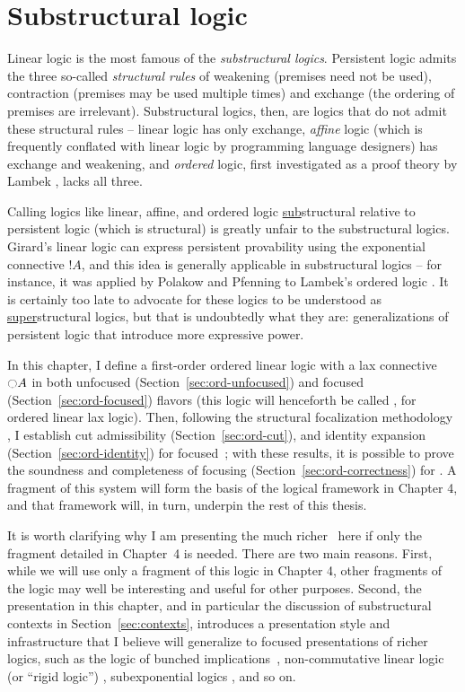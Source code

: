 \chapter{Substructural logic}

Linear logic is the most famous of the {\it substructural logics}.
Persistent logic admits the three so-called {\it structural rules} of
weakening (premises need not be used), contraction (premises may be
used multiple times) and exchange (the ordering of premises are
irrelevant). Substructural logics, then, are logics that do not admit
these structural rules -- linear logic has only exchange, {\it affine}
logic (which is frequently conflated with linear logic by programming
language designers) has exchange and weakening, and {\it ordered}
logic, first investigated as a proof theory by Lambek
\cite{lambek58mathematics}, lacks all three.  

Calling logics like
linear, affine, and ordered logic \underline{sub}structural relative
to persistent logic (which is structural) is greatly unfair to the
substructural logics. Girard's linear logic can express persistent
provability using the exponential connective ${!}A$, and this idea is
generally applicable in substructural logics -- for instance, it was
applied by Polakow and Pfenning to Lambek's ordered logic
\cite{polakow99natural}. It is certainly too
late to advocate for these logics to be understood as
\underline{super}structural logics, but that is undoubtedly what they
are: generalizations of persistent logic that introduce more 
expressive power. 

In this chapter, I define a first-order ordered linear logic with a
lax connective ${\ocircle}A$ in both unfocused
(Section~\ref{sec:ord-unfocused}) and focused
(Section~\ref{sec:ord-focused}) flavors (this logic will henceforth be
called \ollll, for ordered linear lax logic). Then, following the
structural focalization methodology \cite{simmons11structural}, I
establish cut admissibility (Section~\ref{sec:ord-cut}), and identity
expansion (Section~\ref{sec:ord-identity}) for focused~\ollll; with
these results, it is possible to prove the soundness and completeness
of focusing (Section~\ref{sec:ord-correctness}) for \ollll.  A
fragment of this system will form the basis of the logical framework
in Chapter 4, and that framework will, in turn, underpin the rest of
this thesis.

It is worth clarifying why I am presenting the much richer \ollll~here
if only the fragment detailed in Chapter~4 is needed. There are two
main reasons.  First, while we will use only a fragment of this logic
in Chapter 4, other fragments of the logic may well be interesting and
useful for other purposes. Second, the presentation in this chapter,
and in particular the discussion of substructural contexts in
Section~\ref{sec:contexts}, introduces a presentation style and
infrastructure that I believe will generalize to focused presentations
of richer logics, such as the logic of bunched
implications~\cite{pym02semantics}, non-commutative linear logic (or
``rigid logic'') \cite{simmons09linear}, subexponential logics
\cite{nigam09algorithmic}, and so on.

